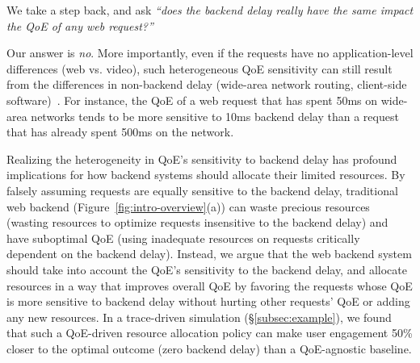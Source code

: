 We take a step back, and ask {\em ``does the backend delay really have the same impact the QoE of any web request?''}

Our answer is {\em no}.  More importantly, even if the requests have no application-level differences (\eg web vs. video), such heterogeneous QoE sensitivity can still result from the differences in non-backend delay (\eg wide-area network routing, client-side software)~\cite{timecard,dqbarge}.
For instance, the QoE of a web request that has spent 50ms on wide-area networks tends to be more sensitive to 10ms backend delay than a request that has already spent 500ms on the network. 

Realizing the heterogeneity in QoE's sensitivity to backend delay has profound implications for how backend systems should allocate their limited resources. 
By falsely assuming requests are equally sensitive to the backend delay, traditional web backend (Figure~\ref{fig:intro-overview}(a)) can waste precious resources (\eg wasting resources to optimize requests insensitive to the backend delay) and have suboptimal QoE (\eg using inadequate resources on requests critically dependent on the backend delay). 
Instead, we argue that the web backend system should take into account the QoE's sensitivity to the backend delay, and allocate resources in a way that improves overall QoE by favoring the requests whose QoE is more sensitive to backend delay without hurting other requests' QoE or adding any new resources.
In a trace-driven simulation (\S\ref{subsec:example}), we found that such a QoE-driven resource allocation policy can make user engagement 50\% closer to the optimal outcome (zero backend delay) than a QoE-agnostic baseline.

